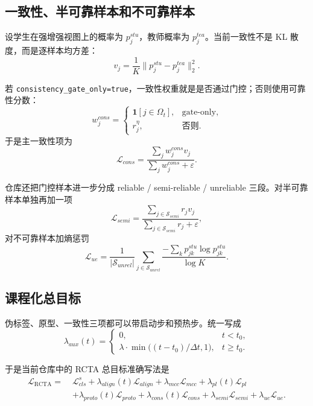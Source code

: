 \documentclass[12pt,a4paper]{ctexart}
\begin{document}
\subsection{一致性、半可靠样本和不可靠样本}

设学生在强增强视图上的概率为 $p_j^{stu}$，教师概率为 $p_j^{tea}$。当前一致性不是 KL 散度，而是逐样本均方差：
\begin{equation}
v_j=\frac{1}{K}\|p_j^{stu}-p_j^{tea}\|_2^2.
\end{equation}

若 \texttt{consistency\_gate\_only=true}，一致性权重就是是否通过门控；否则使用可靠性分数：
\begin{equation}
w_j^{cons}=
\begin{cases}
\mathbf{1}[j\in \Omega_t], & \text{gate-only},\\
r_j^\eta, & \text{否则}.
\end{cases}
\end{equation}
于是主一致性项为
\begin{equation}
\mathcal{L}_{cons}
=
\frac{\sum_j w_j^{cons}v_j}{\sum_j w_j^{cons}+\varepsilon}.
\end{equation}

仓库还把门控样本进一步分成 reliable / semi-reliable / unreliable 三段。对半可靠样本单独再加一项
\begin{equation}
\mathcal{L}_{semi}
=
\frac{\sum_{j\in \mathcal{S}_{semi}} r_j v_j}{\sum_{j\in \mathcal{S}_{semi}} r_j+\varepsilon},
\end{equation}
对不可靠样本加熵惩罚
\begin{equation}
\mathcal{L}_{ue}
=
\frac{1}{|\mathcal{S}_{unrel}|}
\sum_{j\in \mathcal{S}_{unrel}}
\frac{-\sum_k p_{jk}^{stu}\log p_{jk}^{stu}}{\log K}.
\end{equation}

\subsection{课程化总目标}

伪标签、原型、一致性三项都可以带启动步和预热步。统一写成
\begin{equation}
\lambda_{aux}(t)=
\begin{cases}
0, & t<t_0,\\
\lambda \cdot \min\big((t-t_0)/\Delta t,1\big), & t\ge t_0.
\end{cases}
\end{equation}

于是当前仓库中的 RCTA 总目标准确写法是
\begin{align}
\mathcal{L}_{\mathrm{RCTA}}
=\;&
\mathcal{L}_{cls}^s
+
\lambda_{align}(t)\mathcal{L}_{align}
+
\lambda_{mcc}\mathcal{L}_{mcc}
+
\lambda_{pl}(t)\mathcal{L}_{pl}\nonumber\\
&+
\lambda_{proto}(t)\mathcal{L}_{proto}
+
\lambda_{cons}(t)\mathcal{L}_{cons}
+
\lambda_{semi}\mathcal{L}_{semi}
+
\lambda_{ue}\mathcal{L}_{ue}.
\end{align}
\end{document}
